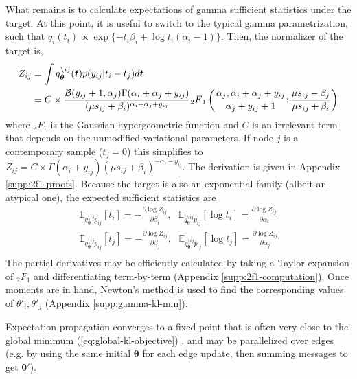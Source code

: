 \documentclass{article}
\begin{document}
What remains is to calculate expectations of gamma sufficient statistics under the target. At this point, it is useful to switch to the typical gamma parametrization, such that $q_{i}(t_i) \propto \exp \{ -t_i \beta_i + \log t_i (\alpha_i - 1) \}$. Then, the normalizer of the target is,
\[
\begin{aligned}
Z_{ij} & = \int q^{\setminus ij}_{\bm \theta}(\bm t) p(y_{ij} | t_i - t_j) d\bm t \\
& = C \times \frac{\mathcal{B}(y_{ij} + 1, \alpha_j) \Gamma(\alpha_i + \alpha_j + y_{ij})}{(\mu s_{ij} + \beta_i)^{\alpha_i + \alpha_j + y_{ij}}} {_2}F{_1}\left( {{\alpha_j,  \alpha_i + \alpha_j + y_{ij} } \atop {\alpha_j + y_{ij} + 1}}; \frac{\mu s_{ij} - \beta_j}{\mu s_{ij} + \beta_i} \right)
\end{aligned}
\]
where ${_2}F{_1}$ is the Gaussian hypergeometric function and $C$ is an irrelevant term that depends on the unmodified variational parameters. If node $j$ is a contemporary sample ($t_j = 0$) this simplifies to $Z_{ij} = C \times \Gamma(\alpha_i + y_{ij}) (\mu s_{ij} + \beta_i)^{-\alpha_i - y_{ij}}$. The derivation is given in Appendix \ref{supp:2f1-proofs}. Because the target is also an exponential family (albeit an atypical one), the expected sufficient statistics are
\[
\begin{aligned}
\mathbb{E}_{q^{\setminus ij}_{\bm \theta} p_{ij}}[t_i] = -\frac{\partial \log Z_{ij}}{\partial \beta_i},~~~ \mathbb{E}_{q^{\setminus ij}_{\bm \theta} p_{ij}}[\log t_i] = \frac{\partial \log Z_{ij}}{\partial \alpha_i} \\
\mathbb{E}_{q^{\setminus ij}_{\bm \theta} p_{ij}}[t_j] = -\frac{\partial \log Z_{ij}}{\partial \beta_j},~~~ \mathbb{E}_{q^{\setminus ij}_{\bm \theta} p_{ij}}[\log t_j] = \frac{\partial \log Z_{ij}}{\partial \alpha_j} \\
\end{aligned}
\] 
The partial derivatives may be efficiently calculated by taking a Taylor expansion of ${_2}F{_1}$ and differentiating term-by-term (Appendix \ref{supp:2f1-computation}). Once moments are in hand, Newton's method is used to find the corresponding values of $\theta'_i, \theta'_j$ (Appendix \ref{supp:gamma-kl-min}).

Expectation propagation converges to a fixed point that is often very close to the global minimum (\ref{eq:global-kl-objective}) \cite{cunningham2014gaussian}, and may be parallelized over edges (e.g. by using the same initial $\bm \theta$ for each edge update, then summing messages to get $\bm \theta'$).
\end{document}
